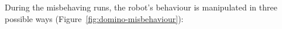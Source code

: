 \documentclass{sig-alternate}
\begin{document}
%
%
%
%
%
%
%
During the misbehaving runs, the robot's behaviour is manipulated in three
possible ways (Figure~\ref{fig:domino-misbehaviour}):
\end{document}
